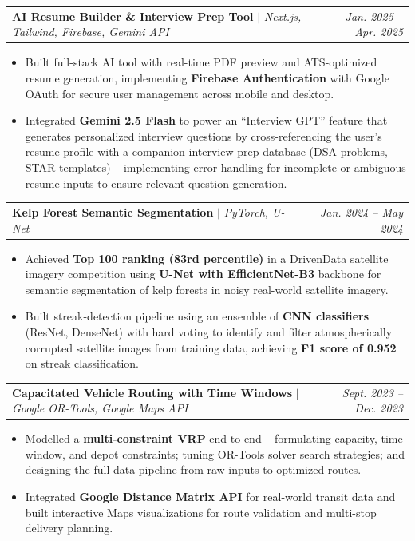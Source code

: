 \documentclass[letterpaper,11pt]{article}
\makeatletter
\newcommand{\resumeItemListStart}{\begin{itemize}[leftmargin=0.2in]}
\newcommand{\resumeItemListEnd}{\end{itemize}\vspace{1pt}}
\newcommand{\resumeItem}[1]{
  \item\small{#1 \vspace{-2pt}}
}
\newcommand{\resumeProjectHeading}[3]{
    \item
    \begin{tabular*}{0.97\textwidth}{l@{\extracolsep{\fill}}r}
      \small\textbf{#1} $|$ \footnotesize\emph{#2} & \textit{\small #3} \\
    \end{tabular*}\vspace{4pt}
}
\makeatother
\begin{document}
    \resumeProjectHeading
        {\textbf{AI Resume Builder \& Interview Prep Tool}}{Next.js, Tailwind, Firebase, Gemini API}{Jan. 2025 -- Apr. 2025}
        \resumeItemListStart
            \resumeItem{Built full-stack AI tool with real-time PDF preview and ATS-optimized resume generation, implementing \textbf{Firebase Authentication} with Google OAuth for secure user management across mobile and desktop.}
            \resumeItem{Integrated \textbf{Gemini 2.5 Flash} to power an ``Interview GPT'' feature that generates personalized interview questions by cross-referencing the user's resume profile with a companion interview prep database (DSA problems, STAR templates) -- implementing error handling for incomplete or ambiguous resume inputs to ensure relevant question generation.}
        \resumeItemListEnd


    \resumeProjectHeading
        {\textbf{Kelp Forest Semantic Segmentation}}{PyTorch, U-Net}{Jan. 2024 -- May 2024}
        \resumeItemListStart
            \resumeItem{Achieved \textbf{Top 100 ranking (83rd percentile)} in a DrivenData satellite imagery competition using \textbf{U-Net with EfficientNet-B3} backbone for semantic segmentation of kelp forests in noisy real-world satellite imagery.}
            \resumeItem{Built streak-detection pipeline using an ensemble of \textbf{CNN classifiers} (ResNet, DenseNet) with hard voting to identify and filter atmospherically corrupted satellite images from training data, achieving \textbf{F1 score of 0.952} on streak classification.}
        \resumeItemListEnd

    \resumeProjectHeading
        {\textbf{Capacitated Vehicle Routing with Time Windows}}{Google OR-Tools, Google Maps API}{Sept. 2023 -- Dec. 2023}
        \resumeItemListStart
            \resumeItem{Modelled a \textbf{multi-constraint VRP} end-to-end -- formulating capacity, time-window, and depot constraints; tuning OR-Tools solver search strategies; and designing the full data pipeline from raw inputs to optimized routes.}
            \resumeItem{Integrated \textbf{Google Distance Matrix API} for real-world transit data and built interactive Maps visualizations for route validation and multi-stop delivery planning.}
        \resumeItemListEnd
\end{document}
